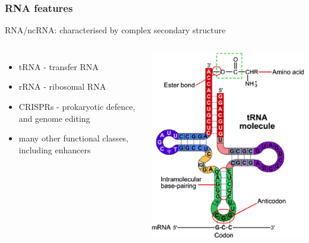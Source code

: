 %
\begin{frame}
  \frametitle{RNA features}
  \textcolor{hutton_blue}{RNA/ncRNA: characterised by complex secondary structure}
  \begin{columns}[T] 
      \begin{itemize}
        \item tRNA - transfer RNA
        \item rRNA - ribosomal RNA
        \item CRISPRs - prokaryotic defence, and genome editing
        \item many other functional classes, including enhancers
      \end{itemize}
      \includegraphics[height=0.7\textheight]{images/rna_feature}
  \end{columns}    
\end{frame}

%

